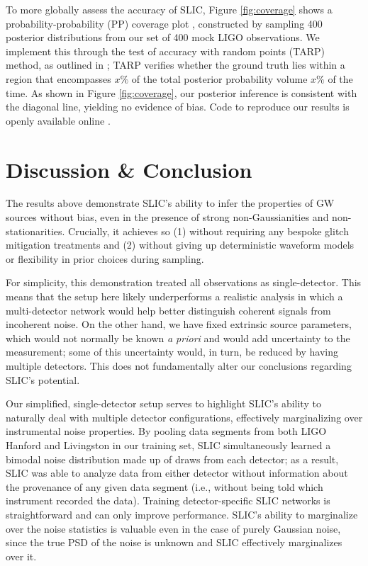 \documentclass[twocolumn]{aastex631}
\begin{document}
To more globally assess the accuracy of SLIC, Figure \ref{fig:coverage} shows a probability-probability (PP) coverage plot \citep{cook2006validation,2018arXiv180406788T}, constructed by sampling 400 posterior distributions from our set of 400 mock LIGO observations. We implement this through the test of accuracy with random points (TARP) method, as outlined in \cite{2023Pablo}; TARP verifies whether the ground truth lies within a region that encompasses \(x\%\) of the total posterior probability volume \(x\%\) of the time. As shown in Figure \ref{fig:coverage}, our posterior inference is consistent with the diagonal line, yielding no evidence of bias.  
Code to reproduce our results is openly available online \citep{slicgw_repo}.




\section{Discussion \& Conclusion}
\label{sec:discussion}

The results above demonstrate SLIC's ability to infer the properties of GW sources without bias, even in the presence of strong non-Gaussianities and non-stationarities.
Crucially, it achieves so (1) without requiring any bespoke glitch mitigation treatments and (2) without giving up deterministic waveform models or flexibility in prior choices during sampling.

For simplicity, this demonstration treated all observations as single-detector. This means that the setup here likely underperforms a realistic analysis in which a multi-detector network would help better distinguish coherent signals from incoherent noise.
On the other hand, we have fixed extrinsic source parameters, which would not normally be known \textit{a priori} and would add uncertainty to the measurement; some of this uncertainty would, in turn, be reduced by having multiple detectors.
This does not fundamentally alter our conclusions regarding SLIC's potential.

Our simplified, single-detector setup serves to highlight SLIC's ability to naturally deal with multiple detector configurations, effectively marginalizing over instrumental noise properties.
By pooling data segments from both LIGO Hanford and Livingston in our training set, SLIC simultaneously learned a bimodal noise distribution made up of draws from each detector; as a result, SLIC was able to analyze data from either detector without information about the provenance of any given data segment (i.e., without being told which instrument recorded the data).
Training detector-specific SLIC networks is straightforward and can only improve performance.
SLIC's ability to marginalize over the noise statistics is valuable even in the case of purely Gaussian noise, since the true PSD of the noise is unknown and SLIC effectively marginalizes over it.
\end{document}

